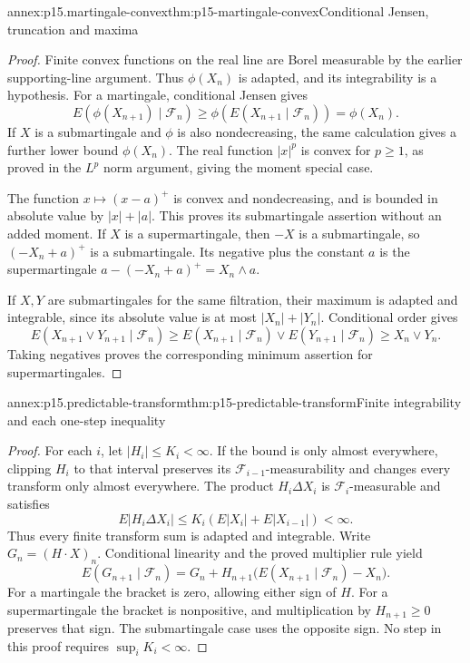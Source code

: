 \begin{annexitem}{annex:p15.martingale-convex}{thm:p15-martingale-convex}{Conditional Jensen, truncation and maxima}
\begin{proof}
Finite convex functions on the real line are Borel measurable
by the earlier supporting-line argument. Thus \(\phi(X_n)\)
is adapted, and its integrability is a hypothesis.
For a martingale, conditional Jensen gives
\[
           E(\phi(X_{n+1})\mid\mathcal F_n)
               \geq\phi(E(X_{n+1}\mid\mathcal F_n))=\phi(X_n).
\]
If \(X\) is a submartingale and \(\phi\) is also nondecreasing,
the same calculation gives a further lower bound \(\phi(X_n)\).
The real function \(|x|^p\) is convex for \(p\geq1\), as proved
in the \(L^p\) norm argument, giving the moment special case.

The function \(x\mapsto(x-a)^+\) is convex and nondecreasing,
and is bounded in absolute value by \(|x|+|a|\).
This proves its submartingale assertion without an added moment.
If \(X\) is a supermartingale, then \(-X\) is a submartingale,
so \((-X_n+a)^+\) is a submartingale.
Its negative plus the constant \(a\) is the supermartingale
\(a-(-X_n+a)^+=X_n\wedge a\).

If \(X,Y\) are submartingales for the same filtration, their
maximum is adapted and integrable, since its absolute value is
at most \(|X_n|+|Y_n|\).
Conditional order gives
\[
 E(X_{n+1}\vee Y_{n+1}\mid\mathcal F_n)
    \geq E(X_{n+1}\mid\mathcal F_n)\vee
                 E(Y_{n+1}\mid\mathcal F_n)
    \geq X_n\vee Y_n.
\]
Taking negatives proves the corresponding minimum assertion
for supermartingales.
\end{proof}
\end{annexitem}

\begin{annexitem}{annex:p15.predictable-transform}{thm:p15-predictable-transform}{Finite integrability and each one-step inequality}
\begin{proof}
For each \(i\), let \(|H_i|\leq K_i<\infty\).
If the bound is only almost everywhere, clipping \(H_i\)
to that interval preserves its \(\mathcal F_{i-1}\)-measurability
and changes every transform only almost everywhere.
The product \(H_i\Delta X_i\) is \(\mathcal F_i\)-measurable
and satisfies
\[
                E|H_i\Delta X_i|
                    \leq K_i(E|X_i|+E|X_{i-1}|)<\infty.
\]
Thus every finite transform sum is adapted and integrable.
Write \(G_n=(H\cdot X)_n\).
Conditional linearity and the proved multiplier rule yield
\[
 E(G_{n+1}\mid\mathcal F_n)
      =G_n+H_{n+1}\bigl(E(X_{n+1}\mid\mathcal F_n)-X_n\bigr).
\]
For a martingale the bracket is zero, allowing either sign of \(H\).
For a supermartingale the bracket is nonpositive, and multiplication
by \(H_{n+1}\geq0\) preserves that sign.
The submartingale case uses the opposite sign.
No step in this proof requires \(\sup_iK_i<\infty\).
\end{proof}
\end{annexitem}

